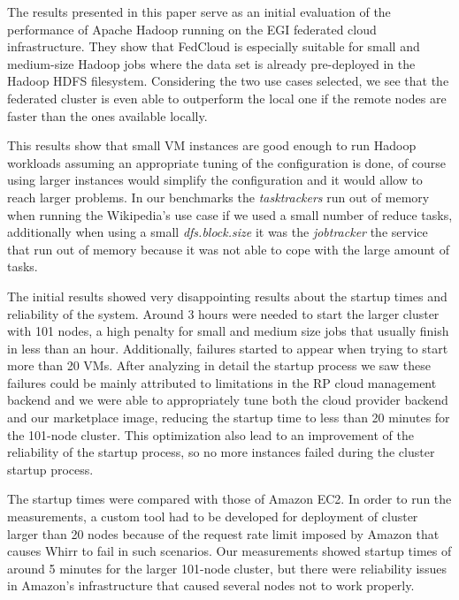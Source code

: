 The results presented in this paper serve as an initial evaluation of the performance of Apache Hadoop running on the EGI federated cloud infrastructure. They show that FedCloud is especially suitable for small and medium-size Hadoop jobs where the data set is already pre-deployed in the Hadoop HDFS filesystem. Considering the two use cases selected, we see that the federated cluster is even able to outperform the local one if the remote nodes are faster than the ones available locally.


This results show that small VM instances are good enough to run Hadoop workloads assuming an appropriate tuning of the configuration is done, of course using larger instances would simplify the configuration and it would allow to reach larger problems. In our benchmarks the \emph{tasktrackers} run out of memory when running the Wikipedia's use case if we used a small number of reduce tasks, additionally when using a small \emph{dfs.block.size} it was the \emph{jobtracker} the service that run out of memory because it was not able to cope with the large amount of tasks.

The initial results showed very disappointing results about the startup times and reliability of the system. Around 3 hours were needed to start the larger cluster with 101 nodes, a high penalty for small and medium size jobs that usually finish in less than an hour. Additionally, failures started to appear when trying to start more than 20 VMs. After analyzing in detail the startup process we saw these failures could be mainly attributed to limitations in the RP cloud management backend and we were able to appropriately tune both the cloud provider backend and our marketplace image, reducing the startup time to less than 20 minutes for the 101-node cluster. This optimization also lead to an improvement of the reliability of the startup process, so no more instances failed during the cluster startup process.

The startup times were compared with those of Amazon EC2. In order to run the measurements, a custom tool had to be developed for deployment of cluster larger than 20 nodes because of the request rate limit imposed by Amazon that causes Whirr to fail in such scenarios. Our measurements showed startup times of around 5 minutes for the larger 101-node cluster, but there were reliability issues in Amazon's infrastructure that caused several nodes not to work properly.

